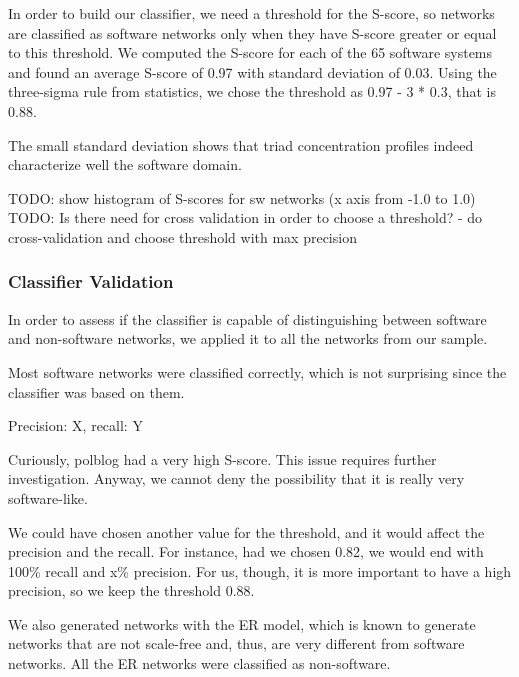In order to build our classifier, we need a threshold for the S-score, so
networks are classified as software networks only when they have S-score greater
or equal to this threshold. We computed the S-score for each of the 65 software
systems and found an average S-score of 0.97 with standard deviation of 0.03.
Using the three-sigma rule from statistics, we chose the threshold as 0.97 - 3 *
0.3, that is 0.88. 

The small standard deviation shows that triad concentration profiles indeed
characterize well the software domain.

TODO: show histogram of S-scores for sw networks (x axis from -1.0 to 1.0)
TODO: Is there need for cross validation in order to choose a threshold?
 - do cross-validation and choose threshold with max precision

\subsubsection{Classifier Validation}

In order to assess if the classifier is capable of distinguishing between
software and non-software networks, we applied it to all the networks from our
sample. 

Most software networks were classified correctly, which is not surprising since
the classifier was based on them.

Precision: X, recall: Y

Curiously, polblog had a very high S-score. This issue requires further 
investigation. Anyway, we cannot deny the possibility that it is really very
software-like.

We could have chosen another value for the threshold, and it would affect the
precision and the recall. For instance, had we chosen 0.82, we would end with
100\% recall and x\% precision. For us, though, it is more important to have a
high precision, so we keep the threshold 0.88.

We also generated networks with the ER model, which is known to generate
networks that are not scale-free and, thus, are very different from software
networks. All the ER networks were classified as non-software.


